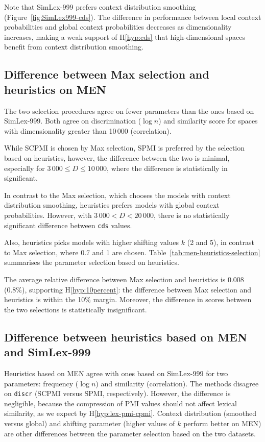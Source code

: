 Note that SimLex-999 prefers context distribution smoothing (Figure~\ref{fig:SimLex999-cds}). The difference in performance between local context probabilities and global context probabilities decreases as dimensionality increases, making a weak support of H\ref{hyp:cds} that high-dimensional spaces benefit from context distribution smoothing.

\subsection{Difference between Max selection and heuristics on MEN}

The two selection procedures agree on fewer parameters than the ones based on SimLex-999. Both agree on discrimination ($\log n$) and similarity score for spaces with dimensionality greater than 10\,000 (correlation).

While SCPMI is chosen by Max selection, SPMI is preferred by the selection based on heuristics, however, the difference between the two is minimal, especially for $3\,000 \le D \le 10\,000$, where the difference is statistically in significant.

In contrast to the Max selection, which chooses the models with context distribution smoothing, heuristics prefers models with global context probabilities. However, with $3\,000 < D <20\,000$, there is no statistically significant difference between \texttt{cds} values.

Also, heuristics picks models with higher shifting values $k$ (2 and 5), in contrast to Max selection, where 0.7 and 1 are chosen. Table~\ref{tab:men-heuristics-selection} summarises the parameter selection based on heuristics.

The average relative difference between Max selection and heuristics is 0.008 (0.8\%), supporting H\ref{hyp:10percent}: the difference between Max selection and heuristics is within the 10\% margin. Moreover, the difference in scores between the two selections is statistically insignificant.

\subsection{Difference between heuristics based on MEN and SimLex-999}

Heuristics based on MEN agree with ones based on SimLex-999 for two parameters: frequency ($\log n$) and similarity (correlation). The methods disagree on \texttt{discr} (SCPMI versus SPMI, respectively). However, the difference is negligible, because the compression of PMI values should not affect lexical similarity, as we expect by H\ref{hyp:lex-pmi-cpmi}. Context distribution (smoothed versus global) and shifting parameter (higher values of $k$ perform better on MEN) are other differences between the parameter selection based on the two datasets.

